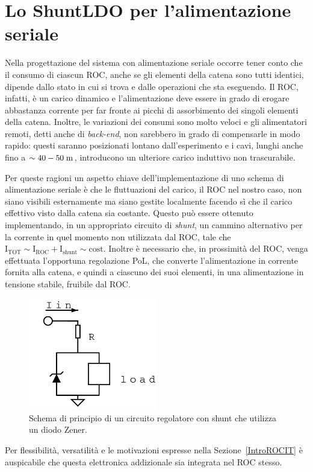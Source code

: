 \section{Lo ShuntLDO per l'alimentazione seriale}
\label{sec:SLDOzener}

Nella progettazione del sistema con alimentazione seriale occorre tener conto che il consumo di ciascun ROC, anche se gli elementi della catena sono tutti identici, dipende dallo stato in cui si trova e dalle operazioni che sta eseguendo. 
Il ROC, infatti, è un carico dinamico e l'alimentazione deve essere in grado di erogare abbastanza corrente per far fronte ai picchi di assorbimento dei singoli elementi della catena.
Inoltre, le variazioni dei consumi sono molto veloci e gli alimentatori remoti, detti anche di \textit{back-end}, non sarebbero in grado di compensarle in modo rapido: questi saranno posizionati lontano dall'esperimento e i cavi, lunghi anche fino a $\sim 40-50\rm \; m$, introducono un ulteriore carico induttivo non trascurabile.

Per queste ragioni un aspetto chiave dell'implementazione di uno schema di alimentazione seriale \`e che le fluttuazioni del carico, il ROC nel nostro caso, non siano visibili esternamente ma siano gestite localmente facendo s\`i che il carico effettivo visto dalla catena sia costante. Questo pu\`o essere ottenuto implementando, in un appropriato circuito di {\em shunt}, un cammino alternativo per la corrente in quel momento non utilizzata dal ROC, tale che $\mathrm{I}_\mathrm{TOT}\sim\mathrm{I}_\mathrm{ROC}+\mathrm{I}_\mathrm{shunt}\sim\mathrm{cost}$. Inoltre \`e necessario che, in prossimit\`a del ROC, venga effettuata l'opportuna regolazione PoL, che converte l'alimentazione in corrente fornita alla catena, e quindi a ciascuno dei suoi elementi, in una alimentazione in tensione stabile, fruibile dal ROC.
\begin{figure}
\centering
\includegraphics[width=0.5\textwidth]{Immagini/zener2}
\caption{Schema di principio di un circuito regolatore con shunt che utilizza un diodo Zener.}
\label{zener}
\end{figure}
Per flessibilit\`a, versatilit\`a e le motivazioni espresse nella Sezione~\ref{IntroROCIT} \`e auspicabile che questa elettronica addizionale sia integrata nel ROC stesso.

